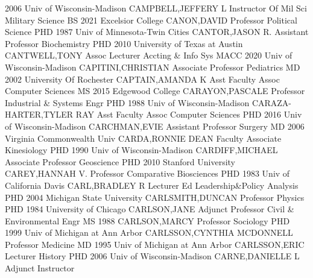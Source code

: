 \documentclass[
]{article}
\begin{document}
2006 Univ of Wisconsin-Madison \textbar CAMPBELL,JEFFERY L
\textbar Instructor Of Mil Sci \textbar{}  \textbar Military
Science \textbar BS 2021 Excelsior College \textbar CANON,DAVID
\textbar Professor \textbar{}  \textbar Political Science
\textbar PHD 1987 Univ of Minnesota-Twin Cities \textbar CANTOR,JASON R.
\textbar Assistant Professor \textbar{} 
\textbar Biochemistry \textbar PHD 2010 University of Texas at Austin
\textbar CANTWELL,TONY \textbar Assoc Lecturer \textbar{} 
\textbar Accting \& Info Sys \textbar MACC 2020 Univ of
Wisconsin-Madison \textbar CAPITINI,CHRISTIAN \textbar Associate
Professor \textbar{}  \textbar Pediatrics \textbar MD 2002
University Of Rochester \textbar CAPTAIN,AMANDA K \textbar Asst Faculty
Assoc \textbar{}  \textbar Computer Sciences \textbar MS 2015
Edgewood College \textbar CARAYON,PASCALE \textbar Professor \textbar{}
 \textbar Industrial \& Systems Engr \textbar PHD 1988 Univ
of Wisconsin-Madison \textbar CARAZA-HARTER,TYLER RAY \textbar Asst
Faculty Assoc \textbar{}  \textbar Computer Sciences
\textbar PHD 2016 Univ of Wisconsin-Madison \textbar CARCHMAN,EVIE
\textbar Assistant Professor \textbar{}  \textbar Surgery
\textbar MD 2006 Virginia Commonwealth Univ \textbar CARDA,RONNIE DEAN
\textbar Faculty Associate \textbar{}  \textbar Kinesiology
\textbar PHD 1990 Univ of Wisconsin-Madison \textbar CARDIFF,MICHAEL
\textbar Associate Professor \textbar{}  \textbar Geoscience
\textbar PHD 2010 Stanford University \textbar CAREY,HANNAH V.
\textbar Professor \textbar{}  \textbar Comparative
Biosciences \textbar PHD 1983 Univ of California Davis
\textbar CARL,BRADLEY R \textbar Lecturer \textbar{} 
\textbar Ed Leadership\&Policy Analysis \textbar PHD 2004 Michigan State
University \textbar CARLSMITH,DUNCAN \textbar Professor \textbar{}
 \textbar Physics \textbar PHD 1984 University of Chicago
\textbar CARLSON,JANE \textbar Adjunct Professor \textbar{} 
\textbar Civil \& Environmental Engr \textbar MS 1988
\textbar CARLSON,MARCY \textbar Professor \textbar{} 
\textbar Sociology \textbar PHD 1999 Univ of Michigan at Ann Arbor
\textbar CARLSSON,CYNTHIA MCDONNELL \textbar Professor \textbar{}
 \textbar Medicine \textbar MD 1995 Univ of Michigan at Ann
Arbor \textbar CARLSSON,ERIC \textbar Lecturer \textbar{} 
\textbar History \textbar PHD 2006 Univ of Wisconsin-Madison
\textbar CARNE,DANIELLE L \textbar Adjunct Instructor \textbar{}
\end{document}
